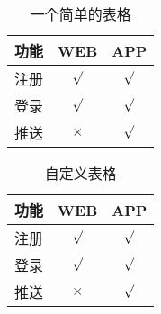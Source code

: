 \documentclass[a4paper,11pt,UTF8,AutoFakeBold= {2.88}]{ctexart}
\begin{document}
\begin{appendix}
\begin{table}[!h!tbp]
\caption{一个简单的表格}\label{tab1}
  \centering
  \begin{tabular}{|l|c|c|}
	\hline
	功能          &WEB         &APP         \\ \hline
	注册          &$\surd$     &$\surd$     \\ \hline
	登录          &$\surd$     &$\surd$     \\ \hline
	推送          &$\times$    &$\surd$     \\ \hline
\end{tabular}
\end{table}

\begin{table}[!h!tbp]
\caption{自定义表格}\label{tab2}
  \centering
\begin{tabular*}{0.75\textwidth}{@{\extracolsep{\fill}}lcc}
    \toprule
    功能          &WEB         &APP         \\
    \midrule
    注册          &$\surd$     &$\surd$     \\
    登录          &$\surd$     &$\surd$     \\
    推送          &$\times$    &$\surd$     \\
    \bottomrule
\end{tabular*}
\end{table}


\end{appendix}
\end{document}
